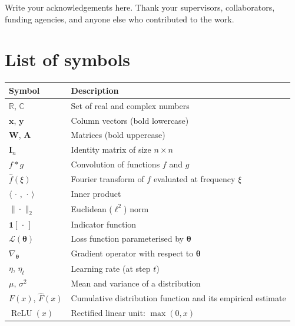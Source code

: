 \documentclass[10pt,b5paper,twoside,openright]{book}
\begin{document}
Write your acknowledgements here. Thank your supervisors, collaborators,
funding agencies, and anyone else who contributed to the work.

\cleardoublepage

\chapter*{List of symbols}
\begin{tabularx}{\textwidth}{@{}lX@{}}
  \toprule
  \textbf{Symbol} & \textbf{Description} \\
  \midrule
  $\mathbb{R}$, $\mathbb{C}$
    & Set of real and complex numbers \\
  $\mathbf{x}$, $\mathbf{y}$
    & Column vectors (bold lowercase) \\
  $\mathbf{W}$, $\mathbf{A}$
    & Matrices (bold uppercase) \\
  $\mathbf{I}_{n}$
    & Identity matrix of size $n\times n$ \\
  $f * g$
    & Convolution of functions $f$ and $g$ \\
  $\hat{f}(\xi)$
    & Fourier transform of $f$ evaluated at frequency $\xi$ \\
  $\langle\,\cdot\,,\,\cdot\,\rangle$
    & Inner product \\
  $\|\cdot\|_{2}$
    & Euclidean ($\ell^{2}$) norm \\
  $\mathbf{1}[\,\cdot\,]$
    & Indicator function \\
  $\mathcal{L}(\boldsymbol{\theta})$
    & Loss function parameterised by $\boldsymbol{\theta}$ \\
  $\nabla_{\!\boldsymbol{\theta}}$
    & Gradient operator with respect to $\boldsymbol{\theta}$ \\
  $\eta$, $\eta_{t}$
    & Learning rate (at step $t$) \\
  $\mu$, $\sigma^{2}$
    & Mean and variance of a distribution \\
  $F(x)$, $\hat{F}(x)$
    & Cumulative distribution function and its empirical estimate \\
  $\operatorname{ReLU}(x)$
    & Rectified linear unit: $\max(0,x)$ \\
  \bottomrule
\end{tabularx}

\cleardoublepage

\tableofcontents

\printacronyms

\mainmatter
\pagestyle{fancy}





\appendix


\stopthumb

\backmatter
\listoffigures
\listoftables
\end{document}
